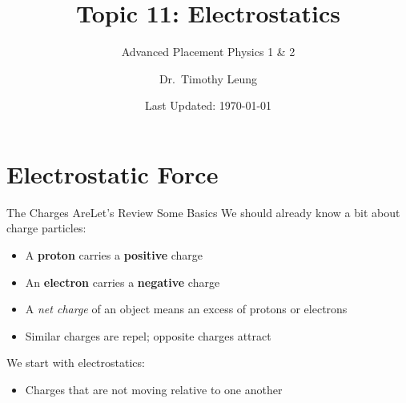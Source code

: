 \documentclass[12pt,aspectratio=169]{beamer}
\title{Topic 11: Electrostatics}
\subtitle{Advanced Placement Physics 1 \& 2}
\author[TML]{Dr.\ Timothy Leung}
\institute{Olympiads School, Toronto, ON, Canada}
\date{Last Updated: \today}
\begin{document}
\begin{frame}
  \maketitle
\end{frame}


%


\section{Electrostatic Force}

\begin{frame}{The Charges Are}{Let's Review Some Basics}
  We should already know a bit about charge particles:
  \begin{itemize}
  \item A \textbf{proton} carries a \textbf{positive} charge
  \item An \textbf{electron} carries a \textbf{negative} charge
  \item A \emph{net charge} of an object means an excess of protons or electrons
  \item Similar charges are repel; opposite charges attract
  \end{itemize}

  \vspace{.2in}We start with electrostatics:
  \begin{itemize}
  \item Charges that are not moving relative to one another
  \end{itemize}
\end{frame}
\end{document}
